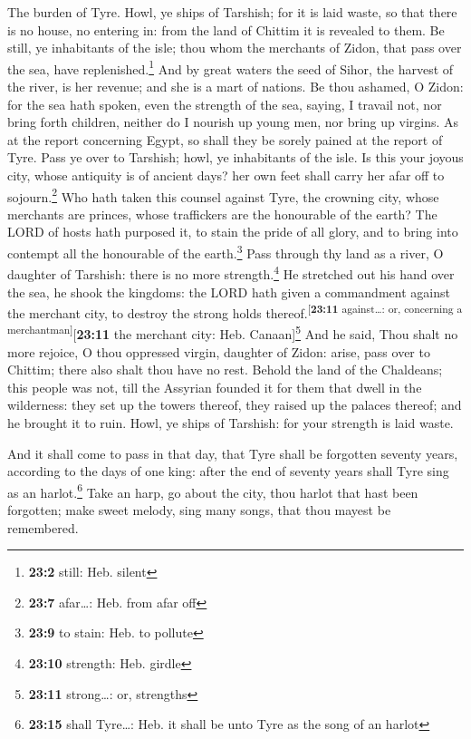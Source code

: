 The burden of Tyre. Howl, ye ships of Tarshish; for it is
laid waste, so that there is no house, no entering in: from the land of
Chittim it is revealed to them.  Be still, ye inhabitants
of the isle; thou whom the merchants of Zidon, that pass over the sea,
have replenished.\footnote{\textbf{23:2} still: Heb. silent}
 And by great waters the seed of Sihor, the harvest of the
river, is her revenue; and she is a mart of nations.  Be
thou ashamed, O Zidon: for the sea hath spoken, even the strength of the
sea, saying, I travail not, nor bring forth children, neither do I
nourish up young men, nor bring up virgins.  As at the
report concerning Egypt, so shall they be sorely pained at the report of
Tyre.  Pass ye over to Tarshish; howl, ye inhabitants of
the isle.  Is this your joyous city, whose antiquity is of
ancient days? her own feet shall carry her afar off to
sojourn.\footnote{\textbf{23:7} afar\ldots: Heb. from afar off}
 Who hath taken this counsel against Tyre, the crowning
city, whose merchants are princes, whose traffickers are the honourable
of the earth?  The LORD of hosts hath purposed it, to
stain the pride of all glory, and to bring into contempt all the
honourable of the earth.\footnote{\textbf{23:9} to stain: Heb. to
  pollute}  Pass through thy land as a river, O daughter
of Tarshish: there is no more strength.\footnote{\textbf{23:10}
  strength: Heb. girdle}  He stretched out his hand over
the sea, he shook the kingdoms: the LORD hath given a commandment
against the merchant city, to destroy the strong holds
thereof.\textsuperscript{{[}\textbf{23:11} against\ldots: or, concerning
a merchantman{]}}{[}\textbf{23:11} the merchant city: Heb.
Canaan{]}\footnote{\textbf{23:11} strong\ldots: or, strengths}
 And he said, Thou shalt no more rejoice, O thou
oppressed virgin, daughter of Zidon: arise, pass over to Chittim; there
also shalt thou have no rest.  Behold the land of the
Chaldeans; this people was not, till the Assyrian founded it for them
that dwell in the wilderness: they set up the towers thereof, they
raised up the palaces thereof; and he brought it to ruin.
 Howl, ye ships of Tarshish: for your strength is laid
waste.

 And it shall come to pass in that day, that Tyre shall
be forgotten seventy years, according to the days of one king: after the
end of seventy years shall Tyre sing as an harlot.\footnote{\textbf{23:15}
  shall Tyre\ldots: Heb. it shall be unto Tyre as the song of an harlot}
 Take an harp, go about the city, thou harlot that hast
been forgotten; make sweet melody, sing many songs, that thou mayest be
remembered.

